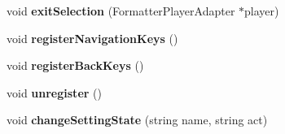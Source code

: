 \begin{CompactItemize}
\item 
void \textbf{exitSelection} (FormatterPlayerAdapter $\ast$player)\label{classbr_1_1pucrio_1_1telemidia_1_1ginga_1_1ncl_1_1focus_1_1FormatterFocusManager_1924081f29403619ed6cd7180e0862d4}

\item 
void \textbf{registerNavigationKeys} ()\label{classbr_1_1pucrio_1_1telemidia_1_1ginga_1_1ncl_1_1focus_1_1FormatterFocusManager_dfc16bd466e0730abf59f8ee95fa20db}

\item 
void \textbf{registerBackKeys} ()\label{classbr_1_1pucrio_1_1telemidia_1_1ginga_1_1ncl_1_1focus_1_1FormatterFocusManager_a483bc107bb8d3a1465fe33473d0d520}

\item 
void \textbf{unregister} ()\label{classbr_1_1pucrio_1_1telemidia_1_1ginga_1_1ncl_1_1focus_1_1FormatterFocusManager_25410dadd5a1f451d82bac6311f649e5}

\item 
void \textbf{changeSettingState} (string name, string act)\label{classbr_1_1pucrio_1_1telemidia_1_1ginga_1_1ncl_1_1focus_1_1FormatterFocusManager_cf99cb2770b6d85469b0063b9030ce1c}

\end{CompactItemize}
